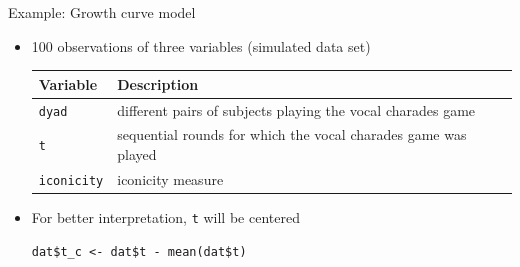 \documentclass[aspectratio=169]{beamer}
\begin{document}
\begin{frame}[fragile]{Example: Growth curve model}
  \begin{itemize}
    \item 100 observations of three variables (simulated data set)\\[2ex]
  \begin{tabular}{lp{10cm}}
      Variable & Description \\
    \hline
      \texttt{dyad} & different pairs of subjects playing the vocal charades game\\
      \texttt{t} & sequential rounds for which the vocal charades game was played \\
      \texttt{iconicity} & iconicity measure \\
     \hline
  \end{tabular}

  \vspace{1cm}
\item For better interpretation, \texttt{t} will be centered
  \begin{lstlisting}
dat$t_c <- dat$t - mean(dat$t)
  \end{lstlisting}
  \end{itemize}
\end{frame}
\end{document}
